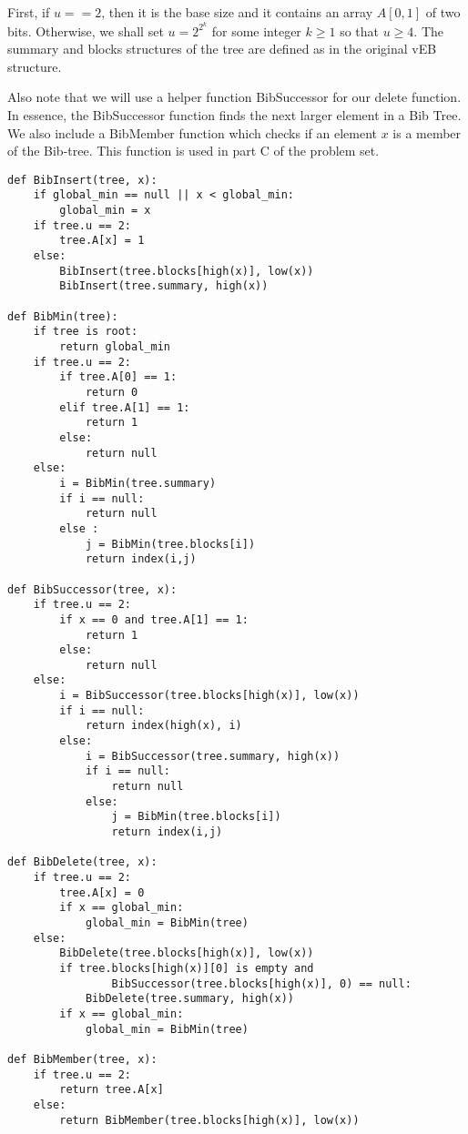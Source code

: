\documentclass[psamsfonts]{amsart}
\newenvironment{sol}{{\bfseries Solution}}{\qedsymbol}
\theoremstyle{definition}
\theoremstyle{remark}
\numberwithin{equation}{section}
\begin{document}
\begin{sol}
First, if $u == 2$, then it is the base size and it contains an array $A[0,1]$ of two bits. Otherwise, we shall set $u = 2^{2^k}$ for some integer $k \geq 1$ so that $u \geq 4$. The summary and blocks structures of the tree are defined as in the original vEB structure.

Also note that we will use a helper function BibSuccessor for our delete function. In essence, the BibSuccessor function finds the next larger element in a Bib Tree. We also include a BibMember function which checks if an element $x$ is a member of the Bib-tree. This function is used in part C of the problem set.

\begin{verbatim}
def BibInsert(tree, x):
    if global_min == null || x < global_min:
        global_min = x
    if tree.u == 2:
        tree.A[x] = 1
    else:
        BibInsert(tree.blocks[high(x)], low(x))
        BibInsert(tree.summary, high(x))

def BibMin(tree):
    if tree is root:
        return global_min
    if tree.u == 2:
        if tree.A[0] == 1:
            return 0
        elif tree.A[1] == 1:
            return 1
        else:
            return null
    else:
        i = BibMin(tree.summary)
        if i == null:
            return null
        else :
            j = BibMin(tree.blocks[i])
            return index(i,j)

def BibSuccessor(tree, x):
    if tree.u == 2:
        if x == 0 and tree.A[1] == 1:
            return 1
        else:
            return null
    else:
        i = BibSuccessor(tree.blocks[high(x)], low(x))
        if i == null:
            return index(high(x), i)
        else:
            i = BibSuccessor(tree.summary, high(x))
            if i == null:
                return null
            else:
                j = BibMin(tree.blocks[i])
                return index(i,j)

def BibDelete(tree, x):
    if tree.u == 2:
        tree.A[x] = 0
        if x == global_min:
            global_min = BibMin(tree)
    else:
        BibDelete(tree.blocks[high(x)], low(x))
        if tree.blocks[high(x)][0] is empty and 
                BibSuccessor(tree.blocks[high(x)], 0) == null:
            BibDelete(tree.summary, high(x))
        if x == global_min:
            global_min = BibMin(tree)

def BibMember(tree, x):
    if tree.u == 2:
        return tree.A[x]
    else:
        return BibMember(tree.blocks[high(x)], low(x))
\end{verbatim}
\end{sol}
\end{document}
